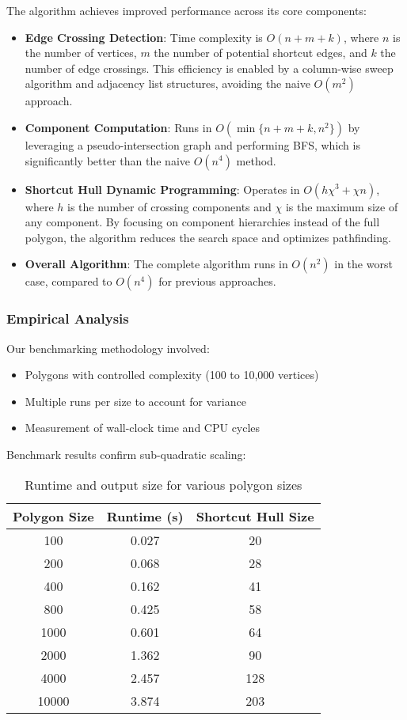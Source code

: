 \documentclass[11pt]{article}
\begin{document}
The algorithm achieves improved performance across its core components:

\begin{itemize}
    \item \textbf{Edge Crossing Detection}: Time complexity is $O(n + m + k)$, where $n$ is the number of vertices, $m$ the number of potential shortcut edges, and $k$ the number of edge crossings. This efficiency is enabled by a column-wise sweep algorithm and adjacency list structures, avoiding the naive $O(m^2)$ approach.
    
    \item \textbf{Component Computation}: Runs in $O(\min\{n + m + k, n^2\})$ by leveraging a pseudo-intersection graph and performing BFS, which is significantly better than the naive $O(n^4)$ method.
    
    \item \textbf{Shortcut Hull Dynamic Programming}: Operates in $O(h\chi^3 + \chi n)$, where $h$ is the number of crossing components and $\chi$ is the maximum size of any component. By focusing on component hierarchies instead of the full polygon, the algorithm reduces the search space and optimizes pathfinding.
    
    \item \textbf{Overall Algorithm}: The complete algorithm runs in $O(n^2)$ in the worst case, compared to $O(n^4)$ for previous approaches.
\end{itemize}

\subsubsection{Empirical Analysis}

Our benchmarking methodology involved:

\begin{itemize}
    \item Polygons with controlled complexity (100 to 10,000 vertices)
    \item Multiple runs per size to account for variance
    \item Measurement of wall-clock time and CPU cycles
\end{itemize}

Benchmark results confirm sub-quadratic scaling:

\begin{table}[h]
\centering
\begin{tabular}{|c|c|c|}
\hline
\textbf{Polygon Size} & \textbf{Runtime (s)} & \textbf{Shortcut Hull Size} \\
\hline
100 & 0.027 & 20 \\
200 & 0.068 & 28 \\
400 & 0.162 & 41 \\
800 & 0.425 & 58 \\
1000 & 0.601 & 64 \\
2000 & 1.362 & 90 \\
4000 & 2.457 & 128 \\
10000 & 3.874 & 203 \\
\hline
\end{tabular}
\caption{Runtime and output size for various polygon sizes}
\end{table}
\end{document}
